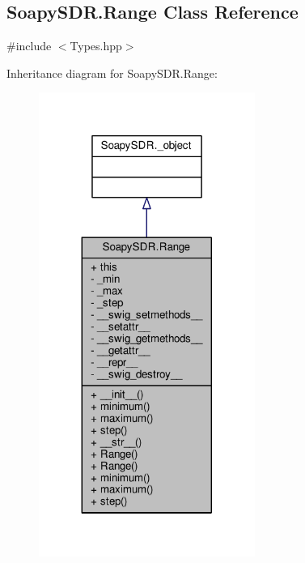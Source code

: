 \subsection{Soapy\+S\+D\+R.\+Range Class Reference}
\label{classSoapySDR_1_1Range}


{\ttfamily \#include $<$Types.\+hpp$>$}



Inheritance diagram for Soapy\+S\+D\+R.\+Range\+:
\nopagebreak
\begin{figure}[H]
\begin{center}
\leavevmode
\includegraphics[width=200pt]{d0/d47/classSoapySDR_1_1Range__inherit__graph}
\end{center}
\end{figure}


